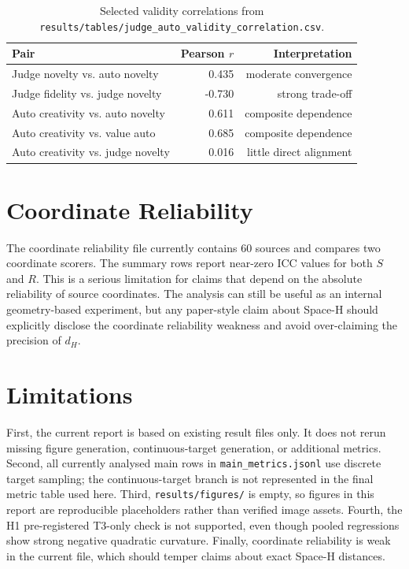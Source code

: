 \documentclass[sigconf,nonacm]{acmart}
\begin{document}
\begin{table}[t]
\centering
\small
\begin{tabular}{lrr}
\toprule
Pair & Pearson $r$ & Interpretation \\
\midrule
Judge novelty vs. auto novelty & 0.435 & moderate convergence \\
Judge fidelity vs. judge novelty & -0.730 & strong trade-off \\
Auto creativity vs. auto novelty & 0.611 & composite dependence \\
Auto creativity vs. value auto & 0.685 & composite dependence \\
Auto creativity vs. judge novelty & 0.016 & little direct alignment \\
\bottomrule
\end{tabular}
\caption{Selected validity correlations from \texttt{results/tables/judge\_auto\_validity\_correlation.csv}.}
\label{tab:judge}
\end{table}

\section{Coordinate Reliability}

The coordinate reliability file currently contains 60 sources and compares two coordinate scorers.
The summary rows report near-zero ICC values for both $S$ and $R$.
This is a serious limitation for claims that depend on the absolute reliability of source coordinates.
The analysis can still be useful as an internal geometry-based experiment, but any paper-style claim about Space-H should explicitly disclose the coordinate reliability weakness and avoid over-claiming the precision of $d_H$.

\section{Limitations}

First, the current report is based on existing result files only.
It does not rerun missing figure generation, continuous-target generation, or additional metrics.
Second, all currently analysed main rows in \texttt{main\_metrics.jsonl} use discrete target sampling; the continuous-target branch is not represented in the final metric table used here.
Third, \texttt{results/figures/} is empty, so figures in this report are reproducible placeholders rather than verified image assets.
Fourth, the H1 pre-registered T3-only check is not supported, even though pooled regressions show strong negative quadratic curvature.
Finally, coordinate reliability is weak in the current file, which should temper claims about exact Space-H distances.
\end{document}
